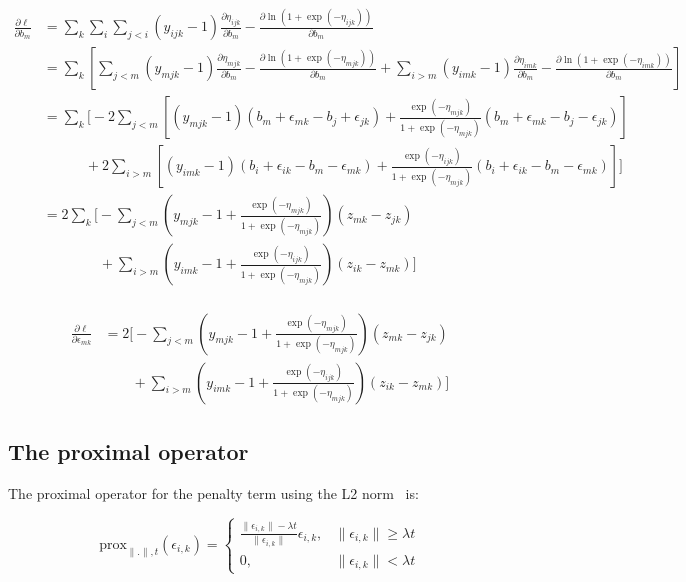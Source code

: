 \documentclass{article}
\begin{document}
\begin{align*}
\frac{\partial \ell}{\partial b_{m}} & =  \sum_k \sum_{i}  \sum_{j<i} (y_{ijk} -1)\frac{\partial \eta_{ijk}}{\partial b_{m}} - \frac{\partial \ln (1+\exp(-\eta_{ijk}))}{\partial b_{m}} \\
& =  \sum_k\left[ \sum_{j<m} (y_{mjk} -1)\frac{\partial \eta_{mjk}}{\partial b_{m}} - \frac{\partial \ln (1+\exp(-\eta_{mjk}))}{\partial b_{m}} +  \sum_{i > m} (y_{imk} -1)\frac{\partial \eta_{imk}}{\partial b_{m}} - \frac{\partial \ln (1+\exp(-\eta_{imk}))}{\partial b_{m}} \right] \\
%
& =  \sum_k\bigg[ -2 \sum_{j<m} \left[(y_{mjk} -1)(b_m + \epsilon_{mk} - b_j + \epsilon_{jk}) + \frac{\exp(-\eta_{mjk})}{1+\exp(-\eta_{mjk})}(b_m + \epsilon_{mk} - b_j - \epsilon_{jk}) \right] \\
& \quad\quad\quad +  2 \sum_{i > m} \left[(y_{imk} -1)(b_i + \epsilon_{ik} - b_m - \epsilon_{mk}) +\frac{\exp(-\eta_{ijk})}{1+\exp(-\eta_{mjk})}(b_i + \epsilon_{ik} - b_m - \epsilon_{mk}) \right] \bigg] \\
& =  2 \sum_k\bigg[ - \sum_{j<m} \left(y_{mjk} -1 + \frac{\exp(-\eta_{mjk})}{1+\exp(-\eta_{mjk})}\right)(z_{mk} - z_{jk})\\
& \quad\quad\quad\quad +  \sum_{i > m} \left(y_{imk} -1 + \frac{\exp(-\eta_{ijk})}{1+\exp(-\eta_{mjk})}\right)(z_{ik} - z_{mk}) \bigg] \\
%
\end{align*}

\begin{align*}
\frac{\partial \ell}{\partial \epsilon_{mk}} & = 2 \bigg[ - \sum_{j<m} \left(y_{mjk} -1 + \frac{\exp(-\eta_{mjk})}{1+\exp(-\eta_{mjk})}\right)(z_{mk} - z_{jk})\\
& \quad\quad +  \sum_{i > m} \left(y_{imk} -1 + \frac{\exp(-\eta_{ijk})}{1+\exp(-\eta_{mjk})}\right)(z_{ik} - z_{mk}) \bigg]
\end{align*}

\subsection{The proximal operator}

The proximal operator for the penalty term using the L2 norm\footnotemark~ is:


\[
\text{prox}_{\|.\|, t}(\epsilon_{i,k}) = 
\begin{cases}
\frac{\|\epsilon_{i,k}\| - \lambda t}{\|\epsilon_{i,k}\|}\epsilon_{i,k}, & \|\epsilon_{i,k}\| \ge \lambda t \\
0, & \|\epsilon_{i,k}\| < \lambda t
\end{cases}
\]
\end{document}
